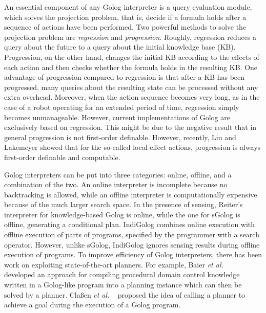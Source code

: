 \documentclass[letterpaper]{article}
\newcommand\etc{{\it et al. }}
\begin{document}
An essential component of any Golog interpreter is a query evaluation module, which solves the projection problem, that is, decide if a formula holds after a sequence of actions have been performed. Two powerful methods to solve the projection problem are {\em
regression} and {\em progression}. Roughly, regression reduces a
query about the future to a query about the initial knowledge base
(KB). Progression, on the other hand, changes the initial KB
according to the effects of each action and then checks whether the
formula holds in the resulting KB.
One advantage of progression
compared to regression is that after a KB has been progressed, many
queries about the resulting state can be processed without any extra
overhead. Moreover, when the action sequence becomes very long, as
in the case of a robot operating for an extended period of time,
regression simply becomes unmanageable. However, current implementations
of Golog are exclusively based on regression. This might be due to the negative result that
in general progression is not first-order definable. However, recently,
Liu and Lakemeyer  showed that for the so-called local-effect actions, progression is always first-order definable and computable.

Golog interpreters can be put into three categories: online, offline, and a combination of the two.
An online interpreter is incomplete because no backtracking is allowed, while an offline interpreter is computationally expensive because of the much larger search space. In the presence of sensing, Reiter's interpreter for knowledge-based Golog is online, while the one for sGolog \cite{Lak99} is offline, generating a conditional plan. IndiGolog combines online execution with offline execution of parts of programs, specified by the programmer with a search operator. However, unlike sGolog, IndiGolog ignores sensing results during offline execution of programs.
To improve efficiency of Golog interpreters, there has been work on exploiting state-of-the-art planners. For example, Baier \etc\  developed an approach for compiling procedural domain control knowledge written in a Golog-like program into a planning instance which can then be solved by a planner.
Cla{\ss}en \etc\  proposed the idea of calling a planner to achieve a goal during the execution of a Golog program.
\end{document}
